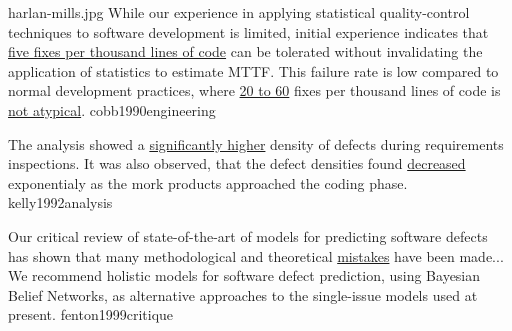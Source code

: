 \documentclass{article}
\begin{document}
\qte
  {harlan-mills.jpg}
  {While our experience in applying statistical quality-control techniques to software development is limited, initial experience indicates that \ul{five fixes per thousand lines of code} can be tolerated without invalidating the application of statistics to estimate MTTF. This failure rate is low compared to normal development practices, where \ul{20 to 60} fixes per thousand lines of code is \ul{not atypical}.}
  {cobb1990engineering}

  {The analysis showed a \ul{significantly higher} density of defects during requirements inspections. It was also observed, that the defect densities found \ul{decreased} exponentialy as the mork products approached the coding phase.}
  {kelly1992analysis}

  {Our critical review of state-of-the-art of models for predicting software defects has shown that many methodological and theoretical \ul{mistakes} have been made... We recommend holistic models for software defect prediction, using Bayesian Belief Networks, as alternative approaches to the single-issue models used at present.}
  {fenton1999critique}

\end{document}
